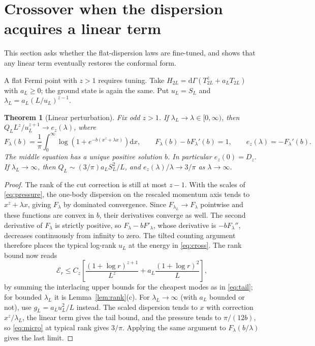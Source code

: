 \documentclass[11pt,a4paper]{article}
\newtheorem{theorem}{Theorem}
\theoremstyle{remark}
\newcommand{\dd}{\mathrm d}
\begin{document}
\section{Crossover when the dispersion acquires a linear term}\label{sec:crossover}
This section asks whether the flat-dispersion laws are fine-tuned, and shows that any linear term eventually restores the conformal form.

A flat Fermi point with $z>1$ requires tuning. Take $H_{2L}=\dd\Gamma(T_{2L}^z+a_LT_{2L})$ with $a_L\ge0$; the ground state is again the same. Put $u_L=S_L$ and $\lambda_L=a_L(L/u_L)^{z-1}$.
\begin{theorem}[Linear perturbation]\label{thm:cross}
Fix odd $z>1$. If $\lambda_L\to\lambda\in[0,\infty)$, then $Q_L L^z/u_L^{z+1}\to e_z(\lambda)$, where
\begin{equation}
 F_\lambda(b)=\frac1\pi\int_0^\infty\log(1+e^{-b(x^z+\lambda x)})\dd x,
 \qquad F_\lambda(b)-b F_\lambda'(b)=1,
 \qquad e_z(\lambda)=-F_\lambda'(b).
 \label{eq:cross}
\end{equation}
The middle equation has a unique positive solution $b$. In particular $e_z(0)=D_z$. If $\lambda_L\to\infty$, then $Q_L\sim(3/\pi)a_L S_L^2/L$, and $e_z(\lambda)/\lambda\to 3/\pi$ as $\lambda\to\infty$.
\end{theorem}
\begin{proof}
The rank of the cut correction is still at most $z-1$. With the scales of \eqref{eq:pressure}, the one-body dispersion on the rescaled momentum axis tends to $x^z+\lambda x$, giving $F_\lambda$ by dominated convergence. Since $F_{\lambda_L}\to F_\lambda$ pointwise and these functions are convex in $b$, their derivatives converge as well. The second derivative of $F_\lambda$ is strictly positive, so $F_\lambda-bF'_\lambda$, whose derivative is $-bF_\lambda''$, decreases continuously from infinity to zero. The tilted counting argument therefore places the typical log-rank $u_L$ at the energy in \eqref{eq:cross}. The rank bound now reads
\[
 \mathcal E_r\le C_z\left[\frac{(1+\log r)^{z+1}}{L^z}
                 +a_L\frac{(1+\log r)^2}{L}\right],
\]
by summing the interlacing upper bounds for the cheapest modes as in \eqref{eq:tail}; for bounded $\lambda_L$ it is Lemma~\ref{lem:rank}(c). For $\lambda_L\to\infty$ (with $a_L$ bounded or not), use $g_L=a_Lu_L^2/L$ instead. The scaled dispersion tends to $x$ with correction $x^z/\lambda_L$, the linear term gives the tail bound, and the pressure tends to $\pi/(12b)$, so \eqref{eq:micro} at typical rank gives $3/\pi$. Applying the same argument to $F_\lambda(b/\lambda)$ gives the last limit.
\end{proof}
\end{document}
